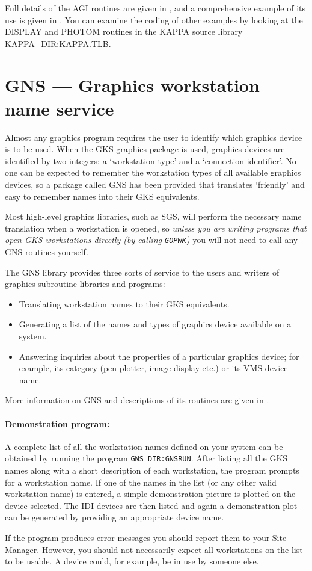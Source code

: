 Full details of the AGI routines are given in , and a
comprehensive example of its use is given in .
You can examine the coding of other examples by looking at the DISPLAY and
PHOTOM routines in the KAPPA source library KAPPA\_DIR:KAPPA.TLB.

\section{GNS --- Graphics workstation name service}

Almost any graphics program requires the user to identify which graphics
device is to be used.
When the GKS graphics package is used, graphics devices are identified by two
integers: a `workstation type' and a `connection identifier'.
No one can be expected to remember the workstation types of all available
graphics devices, so a package called GNS has been provided that translates
`friendly' and easy to remember names into their GKS equivalents.

Most high-level graphics libraries, such as SGS, will perform the necessary name
translation when a workstation is opened, so {\em unless you are writing
programs that open GKS workstations directly (by calling {\tt GOPWK})} you will
not need to call any GNS routines yourself.

The GNS library provides three sorts of service to the users and writers of
graphics subroutine libraries and programs:

\begin{itemize}
\item Translating workstation names to their GKS equivalents.
\item Generating a list of the names and types of graphics device available on
 a system.
\item Answering inquiries about the properties of a particular graphics device;
 for example, its category (pen plotter, image display etc.) or its VMS device
 name.
\end{itemize}
More information on GNS and descriptions of its routines are given in
.

\paragraph{Demonstration program:}\hfill

A complete list of all the workstation names defined on your system can be
obtained by running the program {\tt GNS\_DIR:GNSRUN}.
After listing all the GKS names along with a short description of each
workstation, the program prompts for a workstation name.
If one of the names in the list (or any other valid workstation name) is
entered, a simple demonstration picture is plotted on the device selected.
The IDI devices are then listed and again a demonstration plot can be
generated by providing an appropriate device name.

If the program produces error messages you should report them to your Site
Manager.
However, you should not necessarily expect all workstations on the list to be
usable.
A device could, for example, be in use by someone else.
